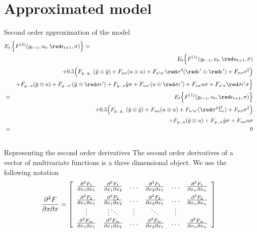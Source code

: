 \documentclass{beamer}
\begin{document}
\section[Approximated model]{Approximated model}
\begin{slide}{Second order approximation of the model}
{\tiny
\begin{eqnarray*}
   \lefteqn{E_t\left\{F^{(2)}(y_{t-1},u_t,{\red \epsilon_{t+1}},\sigma)\right\} =}\\
&& E_t\Big\{F^{(1)}(y_{t-1},u_t,{\red u_{t+1}},\sigma)\\
&&+0.5\Big(F_{y_-y_-}(\hat y\otimes \hat y)+F_{uu}(u\otimes u)+F_{u'u'}{\red \sigma^2}({\red \epsilon'}\otimes {\red \epsilon'})+F_{\sigma\sigma}\sigma^2\Big)\\
&&+F_{y_-u}(\hat y \otimes u)+F_{y_-u'}(\hat y\otimes {\red \sigma\epsilon'})+F_{y_-\sigma}\hat y\sigma+F_{uu'}(u\otimes {\red \sigma\epsilon'})+F_{u\sigma}u\sigma+F_{u'\sigma}{\red \sigma\epsilon'}\sigma\Big\}\\
&=& E_t\Big\{F^{(1)}(y_{t-1},u_t,{\red \epsilon_{t+1}},\sigma)\Big\}\\
&&+0.5\Big(F_{y_-y_-}(\hat y\otimes \hat y)+F_{uu}(u\otimes u)+F_{u'u'}({\red \sigma^2\vec\Sigma_\epsilon})+F_{\sigma\sigma}\sigma^2\Big)\\
&&+F_{y_-u}(\hat y \otimes u)+F_{y_-\sigma}\hat y\sigma+F_{u\sigma}u\sigma\\
&=& 0
\end{eqnarray*}
}
\end{slide}

\subsection[]{}
\begin{slide}{Representing the second order derivatives}
The second order derivatives of a vector of multivariate functions is a three dimensional object. We use the following notation
\[
\frac{\partial^2 F}{\partial x \partial x} = \left[\begin{array}{cccccc}
\frac{\partial^2 F_1}{\partial x_1\partial x_1} & \frac{\partial^2 F_1}{\partial x_1\partial x_2} & \ldots & \frac{\partial^2 F_1}{\partial x_2\partial x_1} & \ldots & \frac{\partial^2 F_1}{\partial x_n\partial x_n} \\
\rule{0pt}{15pt}\frac{\partial^2 F_2}{\partial x_1\partial x_1} & \frac{\partial^2 F_2}{\partial x_1\partial x_2} & \ldots & \frac{\partial^2 F_2}{\partial x_2\partial x_1} & \ldots & \frac{\partial^2 F_2}{\partial x_n\partial x_n} \\
\vdots & \vdots \ddots & \vdots & \ddots & \vdots\\
\frac{\partial^2 F_m}{\partial x_1\partial x_1} & \frac{\partial^2 F_m}{\partial x_1\partial x_2} & \ldots & \frac{\partial^2 F_m}{\partial x_2\partial x_1} & \ldots & \frac{\partial^2 F_m}{\partial x_n\partial x_n}
\end{array}\right]
\]
\end{slide}
\end{document}
